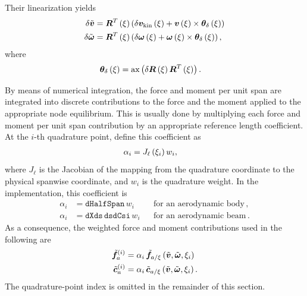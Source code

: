 Their linearization yields
\begin{subequations}
\begin{align}
	\delta\tilde{\bm{v}}
	&=
	\bm{R}^T\left( \xi \right) \left( 
		\delta\bm{v}_{\text{kin}}\left( \xi \right)
		+ \bm{v}\left( \xi \right) \times \bm{\theta}_{\delta}\left( \xi \right)
	 \right)
	\\
	\delta\tilde{\bm{\omega}}
	&=
	\bm{R}^T\left( \xi \right) \left( 
		\delta\bm{\omega}\left( \xi \right)
		+ \bm{\omega}\left( \xi \right) \times \bm{\theta}_{\delta}\left( \xi \right)
	 \right)
	,
\end{align}
\end{subequations}
where
\begin{align}
	\bm{\theta}_{\delta}\left( \xi \right)
	&=
	\text{ax}\left( \delta\bm{R}\left( \xi \right) \bm{R}^T\left( \xi \right) \right)
	.
\end{align}

By means of numerical integration, the force and moment per unit span
are integrated into discrete contributions to the force and the moment
applied to the appropriate node equilibrium.
This is usually done by multiplying each force and moment per unit span
contribution by an appropriate reference length coefficient.
At the $i$-th quadrature point, define this coefficient as
\begin{align}
	\alpha_i &= J_\ell\left( \xi_i \right) w_i
	,
\end{align}
where $J_\ell$ is the Jacobian of the mapping from the quadrature
coordinate to the physical spanwise coordinate, and $w_i$ is the
quadrature weight.  In the implementation, this coefficient is
\begin{subequations}
\begin{align}
	\alpha_i
	&= \texttt{dHalfSpan}\,w_i
	&& \text{for an aerodynamic body}
	\,,
	\\
	\alpha_i
	&= \texttt{dXds}\,\texttt{dsdCsi}\,w_i
	&& \text{for an aerodynamic beam}
	\,.
\end{align}
\end{subequations}
As a consequence, the weighted force and moment contributions used in
the following are
\begin{subequations}
\begin{align}
	\tilde{\bm{f}}_a^{(i)}
	&=
	\alpha_i\,
	\tilde{\bm{f}}_{a/\xi}\left( 
		\tilde{\bm{v}}, \tilde{\bm{\omega}}, \xi_i
	 \right)
	\\
	\tilde{\bm{c}}_a^{(i)}
	&=
	\alpha_i\,
	\tilde{\bm{c}}_{a/\xi}\left( 
		\tilde{\bm{v}}, \tilde{\bm{\omega}}, \xi_i
	 \right)
	.
\end{align}
\end{subequations}
The quadrature-point index is omitted in the remainder of this section.
